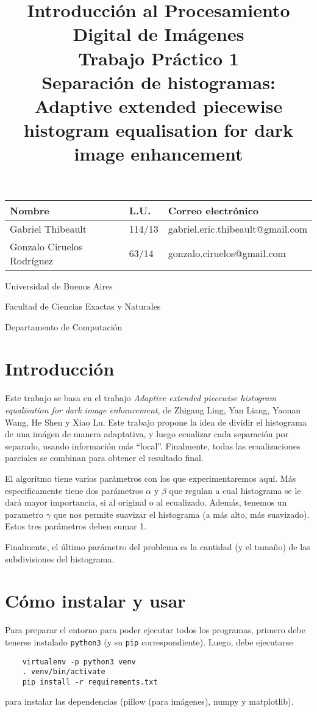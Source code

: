 \documentclass[11pt, spanish]{article}
\title{Introducción al Procesamiento Digital de Imágenes\\
Trabajo Práctico 1 \\
\large Separación de histogramas: \\
Adaptive extended piecewise histogram equalisation for dark image
enhancement}
\date{}
\author{}
\begin{document}
\maketitle
\begin{center}
\begin{large}
\begin{tabular}{|l|l|l|}
 \hline
 \textbf{Nombre} & \textbf{L.U.} & \textbf{Correo electrónico} \\
 \hline
 Gabriel Thibeault & 114/13 & gabriel.eric.thibeault@gmail.com \\
 \hline
 Gonzalo Ciruelos Rodríguez & 63/14 & gonzalo.ciruelos@gmail.com \\
 \hline
\end{tabular}
\end{large}
\end{center}

\vspace{10cm}

\large{
Universidad de Buenos Aires

Facultad de Ciencias Exactas y Naturales

Departamento de Computación
}
\newpage

\section{Introducción}
Este trabajo se basa en el trabajo
\emph{Adaptive extended piecewise histogram equalisation for dark image enhancement},
de Zhigang Ling, Yan Liang, Yaonan Wang, He Shen y Xiao Lu.
Este trabajo propone la idea de dividir el histograma de una imágen de manera adaptativa, y luego
ecualizar cada separación por separado, usando información más ``local''. Finalmente, todas
las ecualizaciones parciales se combinan para obtener el resultado final.

El algoritmo tiene varios parámetros con los que experimentaremos aquí. Más especificamente tiene dos parámetros
$\alpha$ y $\beta$ que regulan a cual histograma se le dará mayor importancia, si al original o al ecualizado.
Además, tenemos un parametro $\gamma$ que nos permite suavizar el histograma (a más alto, más suavizado). Estos tres
parámetros deben sumar 1.

Finalmente, el último parámetro del problema es la cantidad (y el tamaño) de las subdivisiones del histograma.

\section{Cómo instalar y usar}
Para preparar el entorno para poder ejecutar todos los programas,
primero debe tenerse instalado \texttt{python3} (y su \texttt{pip} correspondiente).
Luego, debe ejecutarse 
\begin{verbatim}
    virtualenv -p python3 venv 
    . venv/bin/activate
    pip install -r requirements.txt 
\end{verbatim}
\noindent para instalar las dependencias (pillow (para imágenes), numpy y matplotlib).
\end{document}

